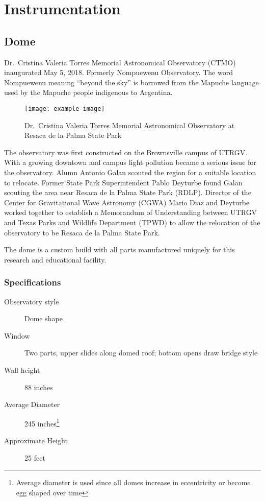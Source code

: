 \chapter{Instrumentation}
\section{Dome}
Dr.\ Cristina Valeria Torres Memorial Astronomical Observatory (CTMO) inaugurated May 5, 2018. 
Formerly Nompuewenu Observatory.
The word Nompuewenu meaning ``beyond the sky'' is borrowed from the Mapuche language used by the Mapuche people indigenous to Argentina.

\begin{figure}[h]
    \centering
    \texttt{[image: example-image]}
\caption{Dr.\ Cristina Valeria Torres Memorial Astronomical Observatory at Resaca de la Palma State Park}
\label{fig:CTMO}
\end{figure}

The observatory was first constructed on the Brownsville campus of UTRGV\@.
With a growing downtown and campus light pollution became a serious issue for the observatory.
Alumn Antonio Galan scouted the region for a suitable location to relocate.
Former State Park Superintendent Pablo Deyturbe found Galan scouting the area near Resaca de la Palma State Park (RDLP).
Director of the Center for Gravitational Wave Astronomy (CGWA) Mario Diaz and Deyturbe worked together to establish  
a Memorandum of Understanding between UTRGV and Texas Parks and Wildlife Department (TPWD) to allow the relocation
of the observatory to be Resaca de la Palma State Park.

The dome is a custom build with all parts manufactured uniquely for this research and educational facility.

\subsection{Specifications}
\begin{description}
    \item[Observatory style] Dome shape
    \item[Window] Two parts, upper slides along domed roof; bottom opens draw bridge style
    \item[Wall height] 88 inches
    \item[Average Diameter] 245 inches\footnote{Average diameter is used since all domes increase in eccentricity or become egg shaped over time}
    \item[Approximate Height] 25 feet
\end{description}

